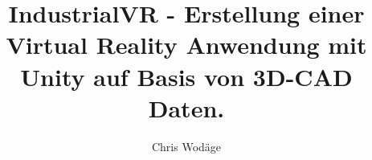 

\newcommand{\sieheKapitel}[1]{\glqq {#1}\grqq}
\newcommand{\sieheAbb}[2]{(siehe Abb. {#1} -- {#2})}

\usepackage[format=plain, justification=RaggedRight, singlelinecheck=false]{caption}

\logoPathL{} %
\gradeType{}
\secondExaminer{}

%

\title{IndustrialVR - Erstellung einer Virtual Reality Anwendung mit Unity auf Basis von 3D-CAD Daten.}
\author{Chris Wodäge}

\makeindex[title=Stichwortverzeichnis, options=-s indexstyle.ist, intoc]

\makeglossaries
{}



\maketitle



\null\thispagestyle{empty}

 \clearpage

\tableofcontents \newpage
{}

 \clearpage
 \clearpage





 \clearpage


\listoffigures \clearpage



%



